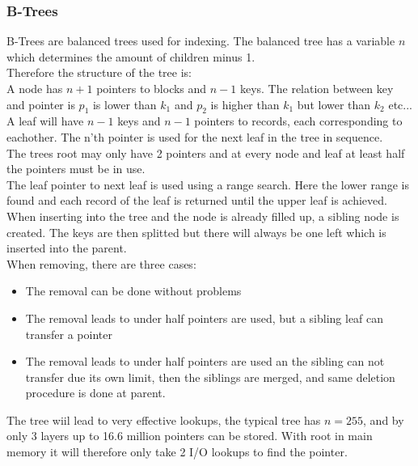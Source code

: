 \documentclass[12pt, a4paper]{article}
\begin{document}
			\subsubsection{B-Trees}
				B-Trees are balanced trees used for indexing. The balanced tree has a variable $n$ which determines the amount of children minus 1.\\
				Therefore the structure of the tree is:\\
				A node has $n+1$ pointers to blocks and $n-1$ keys. The relation between key and pointer is $p_1$ is lower than $k_1$ and $p_2$ is higher than $k_1$ but lower than $k_2$ etc...\\
				A leaf will have $n-1$ keys and $n-1$ pointers to records, each corresponding to eachother. The n'th pointer is used for the next leaf in the tree in sequence.\\[4mm]
				The trees root may only have 2 pointers and at every node and leaf at least half the pointers must be in use.\\
				The leaf pointer to next leaf is used using a range search. Here the lower range is found and each record of the leaf is returned until the upper leaf is achieved.\\
				When inserting into the tree and the node is already filled up, a sibling node is created. The keys are then splitted but there will always be one left which is inserted into the parent.\\
				When removing, there are three cases:
				\begin{itemize}
					\item The removal can be done without problems
					\item The removal leads to under half pointers are used, but a sibling leaf can transfer a pointer
					\item The removal leads to under half pointers are used an the sibling can not transfer due its own limit, then the siblings are merged, and same deletion procedure is done at parent.
				\end{itemize}
				The tree wiil lead to very effective lookups, the typical tree has $n=255$, and by only 3 layers up to 16.6 million pointers can be stored. With root in main memory it will therefore only take 2 I/O lookups to find the pointer.
\end{document}
